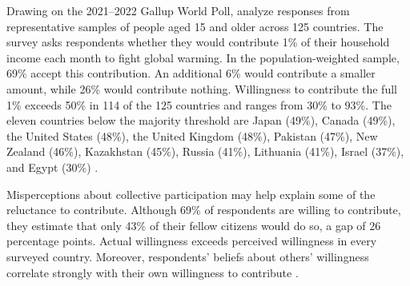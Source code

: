 \documentclass[11pt,a4paper]{article}
\begin{document}
Drawing on the 2021--2022 Gallup World Poll, \citet{andre_globally_2024} analyze responses from representative samples of people aged 15 and older across 125 countries. The survey asks respondents whether they would contribute 1\% of their household income each month to fight global warming. In the population-weighted sample, 69\% accept this contribution. An additional 6\% would contribute a smaller amount, while 26\% would contribute nothing. Willingness to contribute the full 1\% exceeds 50\% in 114 of the 125 countries and ranges from 30\% to 93\%. The eleven countries below the majority threshold are Japan (49\%), Canada (49\%), the United States (48\%), the United Kingdom (48\%), Pakistan (47\%), New Zealand (46\%), Kazakhstan (45\%), Russia (41\%), Lithuania (41\%), Israel (37\%), and Egypt (30\%) \citep[Figure 1 \& Supplementary Table S4]{andre_globally_2024}. 

Misperceptions about collective participation may help explain some of the reluctance to contribute. Although 69\% of respondents are willing to contribute, they estimate that only 43\% of their fellow citizens would do so, a gap of 26 percentage points. Actual willingness exceeds perceived willingness in every surveyed country. Moreover, respondents' beliefs about others' willingness correlate strongly with their own willingness to contribute \citep[Figure 3 \& Supplementary Table S11]{andre_globally_2024}.
\end{document}
